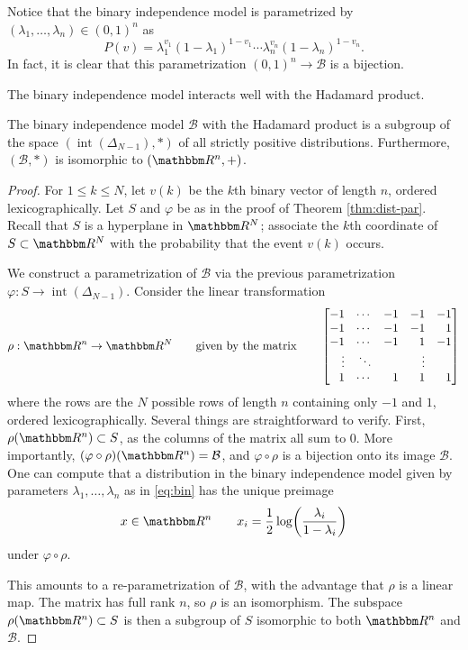 \documentclass[11pt,titlepage]{article}
\newcommand*{\Bin}{\mathcal{B}}
\DeclareMathOperator{\intr}{int}
\numberwithin{equation}{section}
\begin{document}
    Notice that the binary independence model is parametrized by $(\lambda_1,
    \ldots, \lambda_n) \in (0,1)^n$ as
    \begin{equation} \label{eq:bin}
        P(v) 
        = \lambda_1^{v_1}(1 - \lambda_1)^{1 - v_1}
        \cdots \lambda_n^{v_n}(1 - \lambda_n)^{1 - v_n}.
    \end{equation}
    In fact, it is clear that this parametrization $(0,1)^n \to \Bin$ is a
    bijection.

    The binary independence model interacts well with the Hadamard product.
    \begin{theorem}\label{thm:bin-par}
    The binary independence model $\Bin$ with the Hadamard product is a subgroup
    of the space $(\intr(\Delta_{N-1}), *)$ of all strictly positive
    distributions.  Furthermore, $(\Bin, *)$ is  isomorphic to $(\R^n, +)$.
    \end{theorem}
    \begin{proof}
    For $1 \le k \le N$, let $v(k)$ be the $k$th binary vector of length $n$,
    ordered lexicographically.  Let $S$ and $\varphi$ be as in the proof of
    Theorem \ref{thm:dist-par}.  Recall that $S$ is a hyperplane in $\R^N$;
    associate the $k$th coordinate of $S \subset \R^N$ with the probability that
    the event $v(k)$ occurs.  
    
    We construct a parametrization of $\Bin$ via the previous parametrization
    $\varphi : S \to \intr(\Delta_{N-1})$. Consider the linear transformation 
    \[
        \rho: \R^n \to \R^N
        \qquad\text{given by the matrix}\qquad
        \begin{bmatrix*}[r]
            -1 & \cdots & -1 & -1 & -1 \\
            -1 & \cdots & -1 & -1 &  1 \\
            -1 & \cdots & -1 &  1 & -1 \\
            \vdots & \ddots &  & \vdots &  \\
             1 & \cdots &  1 &  1 &  1
        \end{bmatrix*}
    \]
    where the rows are the $N$ possible rows of length $n$ containing only $-1$
    and $1$, ordered lexicographically.  Several things are straightforward to
    verify.  First, $\rho(\R^n) \subset S$, as the columns of the matrix all sum
    to 0.  More importantly, $(\varphi \circ \rho)(\R^n) = \Bin$, and $\varphi
    \circ \rho$ is a bijection onto its image $\Bin$.  One can compute that a
    distribution in the binary independence model given by parameters
    $\lambda_1, \ldots, \lambda_n$ as in \eqref{eq:bin} has the unique preimage
    \[
        x \in \R^n
        \qquad
        x_i = \frac 1 2 \log \pdil*{\frac{\lambda_i}{1 - \lambda_i}}
    \]
    under $\varphi \circ \rho$.  
    
    This amounts to a re-parametrization of $\Bin$, with the advantage that
    $\rho$ is a linear map.  The matrix has full rank $n$, so $\rho$ is an
    isomorphism.  The subspace $\rho(\R^n) \subset S$ is then a subgroup of $S$
    isomorphic to both $\R^n$ and $\Bin$.
    \end{proof}
\end{document}
